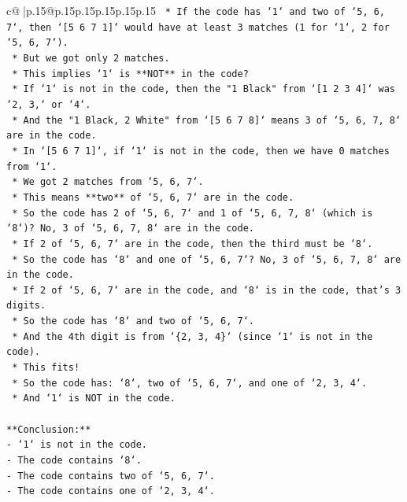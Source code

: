 \documentclass{article}
\begin{document}
{\begin{supertabular}{c@{$\;$}|p{.15\linewidth}@{}p{.15\linewidth}p{.15\linewidth}p{.15\linewidth}p{.15\linewidth}p{.15\linewidth}}
{{{\texttt{        *   If the code has `1` and two of `5, 6, 7`, then `{[}5 6 7 1{]}` would have at least 3 matches (1 for `1`, 2 for `5, 6, 7`).} \\
\texttt{        *   But we got only 2 matches.} \\
\texttt{        *   This implies `1` is **NOT** in the code?} \\
\texttt{        *   If `1` is not in the code, then the "1 Black" from `{[}1 2 3 4{]}` was `2, 3,` or `4`.} \\
\texttt{        *   And the "1 Black, 2 White" from `{[}5 6 7 8{]}` means 3 of `5, 6, 7, 8` are in the code.} \\
\texttt{        *   In `{[}5 6 7 1{]}`, if `1` is not in the code, then we have 0 matches from `1`.} \\
\texttt{        *   We got 2 matches from `5, 6, 7`.} \\
\texttt{        *   This means **two** of `5, 6, 7` are in the code.} \\
\texttt{        *   So the code has 2 of `5, 6, 7` and 1 of `5, 6, 7, 8` (which is `8`)? No, 3 of `5, 6, 7, 8` are in the code.} \\
\texttt{        *   If 2 of `5, 6, 7` are in the code, then the third must be `8`.} \\
\texttt{        *   So the code has `8` and one of `5, 6, 7`? No, 3 of `5, 6, 7, 8` are in the code.} \\
\texttt{        *   If 2 of `5, 6, 7` are in the code, and `8` is in the code, that's 3 digits.} \\
\texttt{        *   So the code has `8` and two of `5, 6, 7`.} \\
\texttt{        *   And the 4th digit is from `\{2, 3, 4\}` (since `1` is not in the code).} \\
\texttt{        *   This fits!} \\
\texttt{        *   So the code has: `8`, two of `5, 6, 7`, and one of `2, 3, 4`.} \\
\texttt{        *   And `1` is NOT in the code.} \\
\\ 
\texttt{**Conclusion:**} \\
\texttt{{-} `1` is not in the code.} \\
\texttt{{-} The code contains `8`.} \\
\texttt{{-} The code contains two of `5, 6, 7`.} \\
\texttt{{-} The code contains one of `2, 3, 4`.} \\
}}}
\end{supertabular}}
\end{document}
